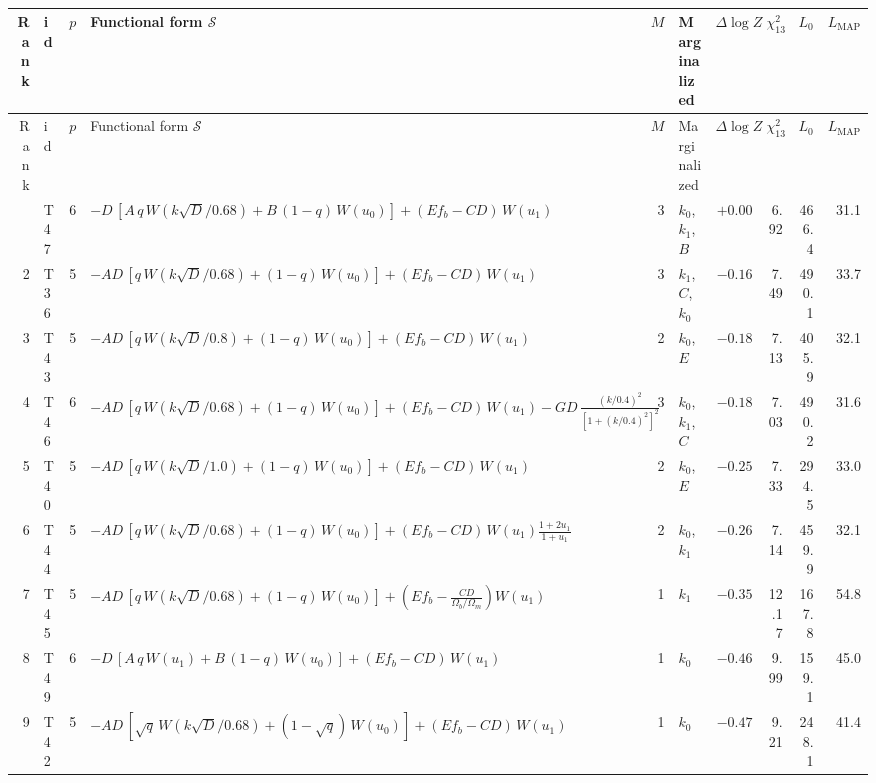 \begingroup\scriptsize\setlength{\tabcolsep}{3pt}
\begin{longtable}{r l r p{} r l r r r r}
\caption{\label{tab:pool_full}}\\
\toprule Rank & id & $p$ & Functional form $\mathcal{S}$ & $M$ & Marginalized & $\Delta\log Z$ & $\chi^2_{13}$ & $L_0$ & $L_\mathrm{MAP}$ \\ \midrule\endfirsthead
\toprule Rank & id & $p$ & Functional form $\mathcal{S}$ & $M$ & Marginalized & $\Delta\log Z$ & $\chi^2_{13}$ & $L_0$ & $L_\mathrm{MAP}$ \\ \midrule\endhead
\bottomrule\endlastfoot
1 & T47 & 6 & $-D\,[A\,q\,W(k\sqrt{D}/0.68)+B\,(1-q)\,W(u_0)]+(E f_b-CD)\,W(u_1)$ & 3 & $k_0$, $k_1$, $B$ & $+0.00$ & 6.92 & 466.4 & 31.1 \\
2 & T36 & 5 & $-AD\,[q\,W(k\sqrt{D}/0.68)+(1-q)\,W(u_0)]+(E f_b-CD)\,W(u_1)$ & 3 & $k_1$, $C$, $k_0$ & $-0.16$ & 7.49 & 490.1 & 33.7 \\
3 & T43 & 5 & $-AD\,[q\,W(k\sqrt{D}/0.8)+(1-q)\,W(u_0)]+(E f_b-CD)\,W(u_1)$ & 2 & $k_0$, $E$ & $-0.18$ & 7.13 & 405.9 & 32.1 \\
4 & T46 & 6 & $-AD\,[q\,W(k\sqrt{D}/0.68)+(1-q)\,W(u_0)]+(E f_b-CD)\,W(u_1)-GD\,\frac{(k/0.4)^2}{[1+(k/0.4)^2]^2}$ & 3 & $k_0$, $k_1$, $C$ & $-0.18$ & 7.03 & 490.2 & 31.6 \\
5 & T40 & 5 & $-AD\,[q\,W(k\sqrt{D}/1.0)+(1-q)\,W(u_0)]+(E f_b-CD)\,W(u_1)$ & 2 & $k_0$, $E$ & $-0.25$ & 7.33 & 294.5 & 33.0 \\
6 & T44 & 5 & $-AD\,[q\,W(k\sqrt{D}/0.68)+(1-q)\,W(u_0)]+(E f_b-CD)\,W(u_1)\frac{1+2u_1}{1+u_1}$ & 2 & $k_0$, $k_1$ & $-0.26$ & 7.14 & 459.9 & 32.1 \\
7 & T45 & 5 & $-AD\,[q\,W(k\sqrt{D}/0.68)+(1-q)\,W(u_0)]+\left(E f_b-\frac{CD}{\Omega_b/\Omega_m}\right)W(u_1)$ & 1 & $k_1$ & $-0.35$ & 12.17 & 167.8 & 54.8 \\
8 & T49 & 6 & $-D\,[A\,q\,W(u_1)+B\,(1-q)\,W(u_0)]+(E f_b-CD)\,W(u_1)$ & 1 & $k_0$ & $-0.46$ & 9.99 & 159.1 & 45.0 \\
9 & T42 & 5 & $-AD\,[\sqrt{q}\,W(k\sqrt{D}/0.68)+(1-\sqrt{q})\,W(u_0)]+(E f_b-CD)\,W(u_1)$ & 1 & $k_0$ & $-0.47$ & 9.21 & 248.1 & 41.4 \\

\end{longtable}
